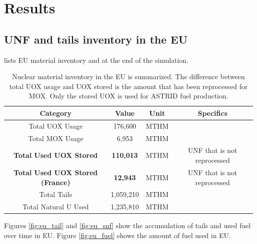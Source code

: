 \section{Results}

\subsection{\gls{UNF} and tails inventory in the \gls{EU}}

 lists \gls{EU} material inventory and
at the end of the simulation.

\begin{table}[h]
	\centering
		\begin{tabular}{cccc}
			\hline
			\textbf{Category } & \textbf{Value} & \textbf{Unit} & \textbf{Specifics}\\ \hline
			Total UOX Usage  & 176,600 & MTHM &  \\ 
			Total MOX Usage  & 6,953 & MTHM & \\ 
			\textbf{Total Used UOX Stored}  & \textbf{110,013} & MTHM & \gls{UNF} that is not reprocessed\\
			\textbf{Total Used UOX Stored (France)} & \textbf{12,943} & MTHM & \gls{UNF} that is not reprocessed \\
			Total Tails  & 1,059,210 & MTHM & \\ 
			Total Natural U Used  & 1,235,810 & MTHM & \\ \hline
		\end{tabular}
		\caption{Nuclear material inventory in the \gls{EU} is summarized. 
				 The difference between total \gls{UOX} usage and \gls{UOX} stored is the amount
				 that has been reprocessed for \gls{MOX}. Only the stored \gls{UOX} is used for \gls{ASTRID} fuel production.}
		\label{tab:sim_result1}
\end {table}
\FloatBarrier


Figures \ref{fig:eu_tail} and \ref{fig:eu_snf} show the 
accumulation of tails and used fuel over time in \gls{EU}.
Figure \ref{fig:eu_fuel} shows the amount of fuel used in \gls{EU}.


